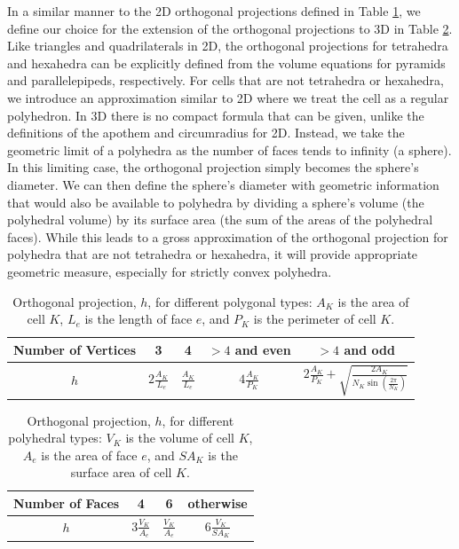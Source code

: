  In a similar manner to the 2D orthogonal projections defined in Table \ref{tab::orth_proj_2D}, we define our choice for the extension of the orthogonal projections to 3D in Table \ref{tab::orth_proj_3D}. Like triangles and quadrilaterals in 2D, the orthogonal projections for tetrahedra and hexahedra can be explicitly defined from the volume equations for pyramids and parallelepipeds, respectively. For cells that are not tetrahedra or hexahedra, we introduce an approximation similar to 2D where we treat the cell as a regular polyhedron. In 3D there is no compact formula that can be given, unlike the definitions of the apothem and circumradius for 2D. Instead, we take the geometric limit of a polyhedra as the number of faces tends to infinity (a sphere). In this limiting case, the orthogonal projection simply becomes the sphere's diameter. We can then define the sphere's diameter with geometric information that would also be available to polyhedra by dividing a sphere's volume (the polyhedral volume) by its surface area (the sum of the areas of the polyhedral faces). While this leads to a gross approximation of the orthogonal projection for polyhedra that are not tetrahedra or hexahedra, it will provide appropriate geometric measure, especially for strictly convex polyhedra.

\begin{table}[h]
\centering
\caption{Orthogonal projection, $h$, for different polygonal types: $A_K$ is the area of cell $K$, $L_e$ is the length of face $e$, and $P_K$ is the perimeter of cell $K$.}
\def\arraystretch{1.4}
\begin{tabular}{|c|c|c|c|c|}
	\hline
	Number of Vertices & 3 & 4 & $>4$ and even& $>4$ and odd \\
	\hline
	$h$ & $2 \frac{A_K}{L_e}$ & $\frac{A_K}{L_e}$ & $4 \frac{A_K}{P_K}$ & $2 \frac{A_K}{P_K} + \sqrt{\frac{2 A_K}{N_K \sin(\frac{2 \pi}{N_K})}}$ \\
	\hline
\end{tabular}
\label{tab::orth_proj_2D}
\end{table}

\begin{table}[h]
\centering
\caption{Orthogonal projection, $h$, for different polyhedral types: $V_K$ is the volume of cell $K$, $A_e$ is the area of face $e$, and $SA_K$ is the surface area of cell $K$.}
\def\arraystretch{1.4}
\begin{tabular}{|c|c|c|c|}
	\hline
	Number of Faces & 4 & 6 & otherwise \\
	\hline
	$h$ & $3 \frac{V_K}{A_e}$ & $\frac{V_K}{A_e}$ & $6 \frac{V_K}{SA_K}$  \\ [1ex]
	\hline
\end{tabular}
\label{tab::orth_proj_3D}
\end{table}

